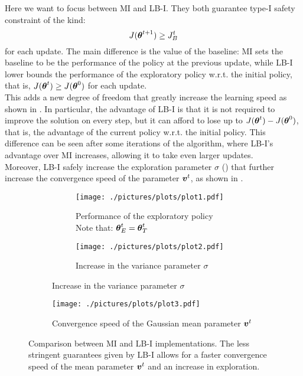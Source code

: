 Here we want to focus between MI and LB-I. They both guarantee type-I safety constraint of the kind:
\[
J({\boldsymbol{\theta}}^{t+1}) \geq {J_{B}^{t}}
\]
for each update. The main difference is the value of the baseline: MI sets the baseline to be the performance of the policy at the previous update, while LB-I lower bounds the performance of the exploratory policy w.r.t. the initial policy, that is, $J({\boldsymbol{\theta}}^t)\geq J({\boldsymbol{\theta}}^0)$ for each update.\\
This adds a new degree of freedom that greatly increase the learning speed as shown in . In particular, the advantage of LB-I is that it is not required to improve the solution on every step, but it can afford to lose up to $J({\boldsymbol{\theta}}^t) - J({\boldsymbol{\theta}}^0)$, that is, the advantage of the current policy w.r.t. the initial policy. This difference can be seen after some iterations of the algorithm, where LB-I's advantage over MI increases, allowing it to take even larger updates.\\
Moreover, LB-I safely increase the exploration parameter $\sigma$ () that further increase the convergence speed of the parameter $\boldsymbol{v}^t$, as shown in .

\begin{figure}[t]
\centering
\begin{subfigure}[t]{\textwidth}
\begin{subfigure}[t]{0.5\textwidth}
\texttt{[image: ./pictures/plots/plot1.pdf]}
\caption{Performance of the exploratory policy \\Note that: ${\boldsymbol{\theta}}^t_E = {\boldsymbol{\theta}}^t_T$} \label{fig:plot1-1}
\end{subfigure}
\hfill
\begin{subfigure}[t]{0.5\textwidth}
\texttt{[image: ./pictures/plots/plot2.pdf]}
\caption{Increase in the variance parameter $\sigma$} \label{fig:plot1-2}
\end{subfigure}
\end{subfigure}
\begin{subfigure}[t]{0.5\textwidth}
\texttt{[image: ./pictures/plots/plot3.pdf]}
\caption{Convergence speed of the Gaussian mean parameter $\boldsymbol{v}^t$} \label{fig:plot1-3}
\end{subfigure}
\caption{Comparison between MI and LB-I implementations. The less stringent guarantees given by LB-I allows for a faster convergence speed of the mean parameter $\boldsymbol{v}^t$ and an increase in exploration. }
\label{fig:plot1}
\end{figure}


